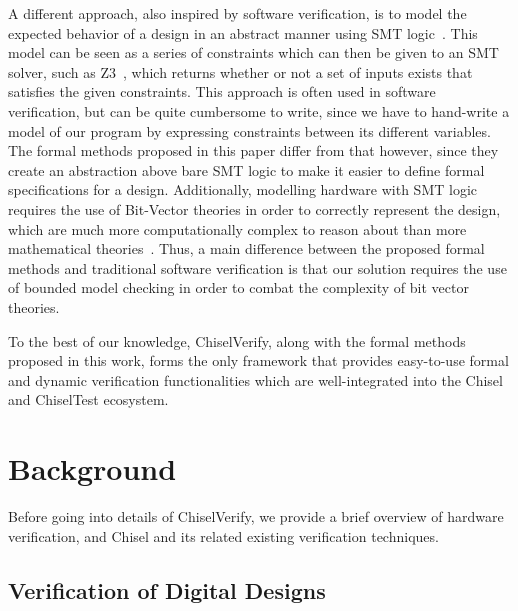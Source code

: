 \documentclass[conference]{IEEEtran}
\newcommand{\martin}[1]{{\color{blue} Martin: #1}}
\newcommand{\hjd}[1]{{\color{pink} Hans: #1}}
\begin{document}
A different approach, also inspired by software verification, is to model the expected behavior of a design in an abstract manner using SMT logic~\cite{smt}.
This model can be seen as a series of constraints which can then be given to an SMT solver, such as Z3~\cite{de2008z3}, which returns whether or not a set of inputs exists that satisfies the given constraints.
This approach is often used in software verification, but can be quite cumbersome to write, since we have to hand-write a model of our program by expressing constraints between its different variables.
The formal methods proposed in this paper differ from that however, since they create an abstraction above bare SMT logic to make it easier to define formal specifications for a design.
Additionally, modelling hardware with SMT logic requires the use of Bit-Vector theories in order to correctly represent the design, which are much more computationally complex to reason about than more mathematical theories~\cite{DecisionBitVector:1998}.
Thus, a main difference between the proposed formal methods and traditional software verification is that our solution requires the use of bounded model checking in order to combat the complexity of bit vector theories.


To the best of our knowledge, ChiselVerify, along with the formal methods proposed in this work, forms the only framework that provides easy-to-use formal and dynamic verification functionalities which are well-integrated into the Chisel and ChiselTest ecosystem.



\section{Background}
\label{sec:background}


Before going into details of ChiselVerify, we provide a brief overview of hardware verification, 
and Chisel and its related existing verification techniques.

\subsection{Verification of Digital Designs}
\end{document}
